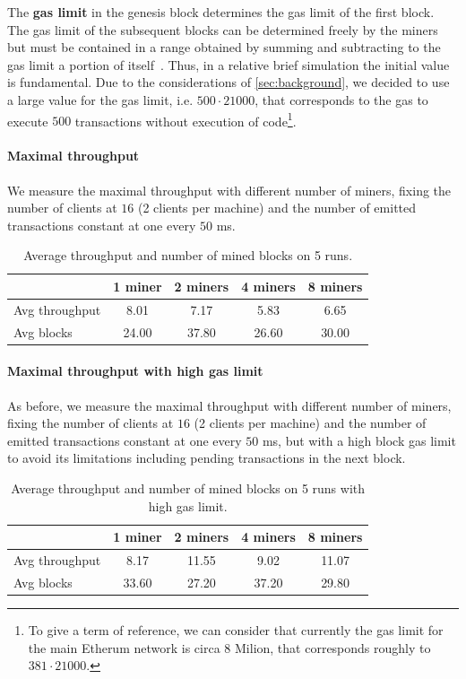 The \textbf{gas limit} in the genesis block determines the gas limit of the
first block. The gas limit of the subsequent blocks can be determined freely by
the miners but must be contained in a range obtained by summing and subtracting
to the gas limit a portion of itself~\cite{wood2018ethereum}. Thus, in a
relative brief simulation the initial value is fundamental. Due to the
considerations of \autoref{sec:background}, we decided to use a large value for
the gas limit, i.e. $500 \cdot 21000$, that corresponds to the gas to execute
$500$ transactions without execution of code\footnote{To give a term of
reference, we can consider that currently the gas limit for the main Etherum
network is circa $8$ Milion, that corresponds roughly to $381 \cdot 21000$.}.


\paragraph{Maximal throughput}
\label{sec:max-troughput}
We measure the maximal throughput with different number of miners, fixing the
number of clients at $16$ (2 clients per machine) and the number of emitted
transactions constant at one every $50$ ms. 

\begin{table}[h]
  \centering
  \begin{tabular}{lcccc}
    \hline
    & 1 miner & 2 miners & 4 miners & 8 miners \\ \hline
    Avg throughput & 8.01 & 7.17 & 5.83 & 6.65 \\ \hline
    Avg blocks & 24.00 & 37.80 & 26.60 & 30.00 \\ \hline
  \end{tabular}
  \caption{Average throughput and number of mined blocks on 5 runs.}
  \label{tab:max-troughput}
\end{table}


\paragraph{Maximal throughput with high gas limit}
\label{sec:max-throughput-high-gaslimit}
As before, we measure the maximal throughput with different number of miners,
fixing the number of clients at $16$ (2 clients per machine) and the number of
emitted transactions constant at one every $50$ ms, but with a high block gas
limit to avoid its limitations including pending transactions in the next block.

\begin{table}[h]
  \centering
  \begin{tabular}{lcccc}
    \hline
    & 1 miner & 2 miners & 4 miners & 8 miners \\ \hline
    Avg throughput & 8.17 & 11.55 & 9.02 & 11.07 \\ \hline
    Avg blocks & 33.60 & 27.20 & 37.20 & 29.80 \\ \hline
  \end{tabular}
  \caption{Average throughput and number of mined blocks on 5 runs with high gas limit.}
  \label{tab:max-troughput-high-gaslimit}
\end{table}
